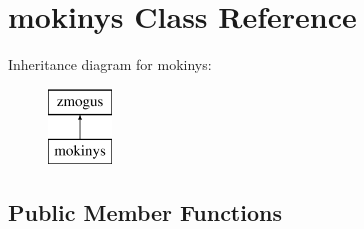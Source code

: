 \hypertarget{classmokinys}{}\section{mokinys Class Reference}
\label{classmokinys}
Inheritance diagram for mokinys\+:\begin{figure}[H]
\begin{center}
\leavevmode
\includegraphics[height=2.000000cm]{classmokinys}
\end{center}
\end{figure}
\subsection*{Public Member Functions}

